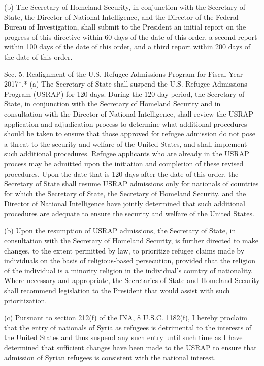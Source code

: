 (b) The Secretary of Homeland Security, in conjunction with the
Secretary of State, the Director of National Intelligence, and the
Director of the Federal Bureau of Investigation, shall submit to the
President an initial report on the progress of this directive within 60
days of the date of this order, a second report within 100 days of the
date of this order, and a third report within 200 days of the date of
this order.

Sec. 5. Realignment of the U.S. Refugee Admissions Program for Fiscal
Year 2017*.* (a) The Secretary of State shall suspend the U.S. Refugee
Admissions Program (USRAP) for 120 days. During the 120-day period, the
Secretary of State, in conjunction with the Secretary of Homeland
Security and in consultation with the Director of National Intelligence,
shall review the USRAP application and adjudication process to determine
what additional procedures should be taken to ensure that those approved
for refugee admission do not pose a threat to the security and welfare
of the United States, and shall implement such additional procedures.
Refugee applicants who are already in the USRAP process may be admitted
upon the initiation and completion of these revised procedures. Upon the
date that is 120 days after the date of this order, the Secretary of
State shall resume USRAP admissions only for nationals of countries for
which the Secretary of State, the Secretary of Homeland Security, and
the Director of National Intelligence have jointly determined that such
additional procedures are adequate to ensure the security and welfare of
the United States.

(b) Upon the resumption of USRAP admissions, the Secretary of State, in
consultation with the Secretary of Homeland Security, is further
directed to make changes, to the extent permitted by law, to prioritize
refugee claims made by individuals on the basis of religious-based
persecution, provided that the religion of the individual is a minority
religion in the individual's country of nationality. Where necessary and
appropriate, the Secretaries of State and Homeland Security shall
recommend legislation to the President that would assist with such
prioritization.

(c) Pursuant to section 212(f) of the INA, 8 U.S.C. 1182(f), I hereby
proclaim that the entry of nationals of Syria as refugees is detrimental
to the interests of the United States and thus suspend any such entry
until such time as I have determined that sufficient changes have been
made to the USRAP to ensure that admission of Syrian refugees is
consistent with the national interest.

